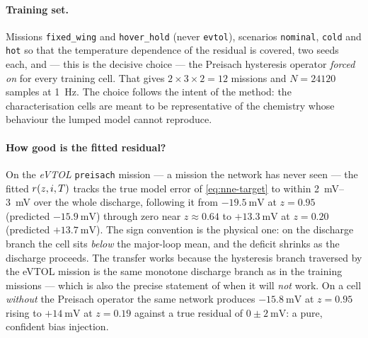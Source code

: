 \paragraph{Training set.}  Missions \texttt{fixed\_wing} and \texttt{hover\_hold} (never
\texttt{evtol}), scenarios \texttt{nominal}, \texttt{cold} and \texttt{hot} so that the
temperature dependence of the residual is covered, two seeds each, and --- this is the decisive
choice --- the Preisach hysteresis operator \emph{forced on} for every training cell.  That gives
$2\times3\times2 = 12$ missions and $N = \num{24120}$ samples at \SI{1}{\hertz}.  The choice
follows the intent of the method: the characterisation cells are meant to be representative of the
chemistry whose behaviour the lumped model cannot reproduce.

\paragraph{How good is the fitted residual?}  On the \emph{eVTOL} \texttt{preisach} mission --- a
mission the network has never seen --- the fitted $r(z,i,T)$ tracks the true model error of
\cref{eq:nne-target} to within \SIrange{2}{3}{\milli\volt} over the whole discharge, following it
from $-\SI{19.5}{\milli\volt}$ at $z = 0.95$ (predicted $-\SI{15.9}{\milli\volt}$) through zero
near $z \approx 0.64$ to $+\SI{13.3}{\milli\volt}$ at $z = 0.20$ (predicted
$+\SI{13.7}{\milli\volt}$).  The sign convention is the physical one: on the discharge branch the
cell sits \emph{below} the major-loop mean, and the deficit shrinks as the discharge proceeds.  The
transfer works because the hysteresis branch traversed by the eVTOL mission is the same monotone
discharge branch as in the training missions --- which is also the precise statement of when it
will \emph{not} work.  On a cell \emph{without} the Preisach operator the same network produces
$-\SI{15.8}{\milli\volt}$ at $z = 0.95$ rising to $+\SI{14}{\milli\volt}$ at $z = 0.19$ against a
true residual of $0\pm\SI{2}{\milli\volt}$: a pure, confident bias injection.

